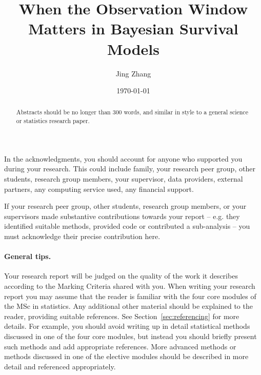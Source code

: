 \documentclass{statsmsc}
\title{When the Observation Window Matters in Bayesian Survival Models}
\author{Jing Zhang}
\date{\today}
\begin{document}
\maketitle

\declarationdate{\today}%
\declaration 


\begin{acknowledgements}
    In the acknowledgments, you should account for anyone who supported you during your research. This could include family, your research peer group, other students, research group members, your supervisor, data providers, external partners, any computing service used, any financial support. 
    
    If your research peer group, other students, research group members, or your supervisors made substantive contributions towards your report -- e.g. they identified suitable methods, provided code or contributed a sub-analysis -- you must acknowledge their precise contribution here.
\end{acknowledgements}

\setcounter{tocdepth}{2} 
\tableofcontents
\clearpage
\mainmatter


\begin{abstract}
    Abstracts should be no longer than 300 words, and similar in style to a general science or statistics research paper.
\end{abstract}

%
%
\paragraph{General tips.} Your research report will be judged on the quality of the work it describes according to the Marking Criteria shared with you. 
When writing your research report you may assume that the reader is familiar with the four core modules of the MSc in statistics. Any additional other material should be explained to the reader, providing suitable references. See Section~\ref{sec:referencing} for more details. For example, you should avoid writing up in detail statistical methods discussed in one of the four core modules, but instead you should briefly present such methods and add appropriate references. More advanced methods or methods discussed in one of the elective modules should be described in more detail and referenced appropriately. 
\end{document}

